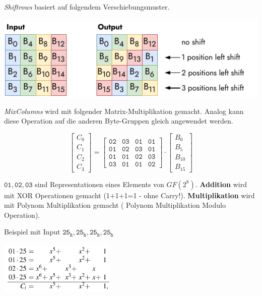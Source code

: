\documentclass[
  10pt,
  a4paper,
]{article}
\newcommand*\circled[1]{\tikz[baseline=(char.base)]{
          \node[shape=circle,draw,inner sep=1pt] (char) {{\scriptsize#1}};}}
\begin{document}
\begin{multicols*}{2}
\begin{tcolorbox}
\emph{Shiftrows} basiert auf folgendem Verschiebungsmuster.

\includegraphics{images/crypto/shiftrow.pdf}

\emph{MixColumns} wird mit folgender Matrix-Multiplikation gemacht.
Analog kann diese Operation auf die anderen Byte-Gruppen gleich
angewendet werden.

\[
\begin{bmatrix}
C_0\\ C_1\\ C_2 \\ C_3
\end{bmatrix}=\begin{bmatrix}
\mathtt{02} & \mathtt{03} & \mathtt{01} & \mathtt{01}\\
\mathtt{01} & \mathtt{02} & \mathtt{03} & \mathtt{01}\\
\mathtt{01} & \mathtt{01} & \mathtt{02} & \mathtt{03}\\
\mathtt{03} & \mathtt{01} & \mathtt{01} & \mathtt{02}
\end{bmatrix}\cdot\begin{bmatrix}
B_0\\ B_{5}\\ B_{10} \\ B_{15}
\end{bmatrix}
\]

\(\mathtt{01},\mathtt{02},\mathtt{03}\) sind Representationen eines
Elements von \(GF(2^8)\). \textbf{Addition} wird mit XOR Operationen
gemacht (1+1+1=1 - ohne Carry!). \textbf{Multiplikation} wird mit
Polynom Multiplikation gemacht (\circled{1} Polynom Multiplikation
\circled{2} Modulo Operation).

Beispiel mit Input \(\mathtt{25_h,25_h,25_h,25_h}\)

\begin{center}
\includegraphics[width=\textwidth,height=2.5cm]{images/crypto/image-17.png}
\end{center}


\end{tcolorbox}
\end{multicols*}
\end{document}
